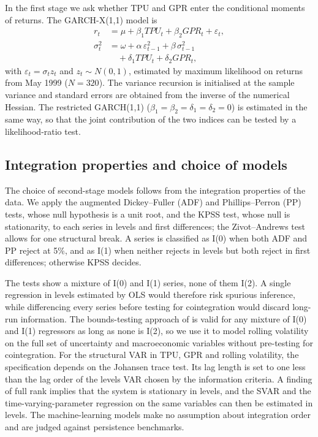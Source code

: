 \documentclass[10pt,twocolumn,a4paper]{article}
\begin{document}
In the first stage we ask whether TPU and GPR enter the conditional moments of returns. The GARCH-X(1,1) model is
\begin{align}
r_t &= \mu + \beta_1 TPU_t + \beta_2 GPR_t + \varepsilon_t, \\
\sigma^2_t &= \omega + \alpha\,\varepsilon^2_{t-1} + \beta\,\sigma^2_{t-1} \nonumber\\
&\quad + \delta_1 TPU_t + \delta_2 GPR_t ,
\end{align}
with $\varepsilon_t = \sigma_t z_t$ and $z_t\sim N(0,1)$, estimated by maximum likelihood on returns from May 1999 ($N=320$). The variance recursion is initialised at the sample variance and standard errors are obtained from the inverse of the numerical Hessian. The restricted GARCH(1,1) ($\beta_1=\beta_2=\delta_1=\delta_2=0$) is estimated in the same way, so that the joint contribution of the two indices can be tested by a likelihood-ratio test.

\subsection{Integration properties and choice of models}

The choice of second-stage models follows from the integration properties of the data. We apply the augmented Dickey--Fuller (ADF) and Phillips--Perron (PP) tests, whose null hypothesis is a unit root, and the KPSS test, whose null is stationarity, to each series in levels and first differences; the Zivot--Andrews test \citep{zivot1992} allows for one structural break. A series is classified as I(0) when both ADF and PP reject at 5\%, and as I(1) when neither rejects in levels but both reject in first differences; otherwise KPSS decides.

The tests show a mixture of I(0) and I(1) series, none of them I(2). A single regression in levels estimated by OLS would therefore risk spurious inference, while differencing every series before testing for cointegration would discard long-run information. The bounds-testing approach of \citet{pesaran2001} is valid for any mixture of I(0) and I(1) regressors as long as none is I(2), so we use it to model rolling volatility on the full set of uncertainty and macroeconomic variables without pre-testing for cointegration. For the structural VAR in TPU, GPR and rolling volatility, the specification depends on the Johansen trace test. Its lag length is set to one less than the lag order of the levels VAR chosen by the information criteria. A finding of full rank implies that the system is stationary in levels, and the SVAR and the time-varying-parameter regression on the same variables can then be estimated in levels. The machine-learning models make no assumption about integration order and are judged against persistence benchmarks.
\end{document}
